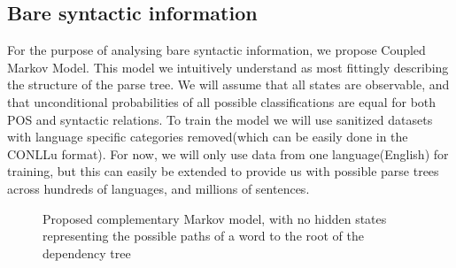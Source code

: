 \subsection{Bare syntactic information}
For the purpose of analysing bare syntactic information, we propose Coupled Markov Model. This model we intuitively understand as most fittingly describing
the structure of the parse tree. We will assume that all states are observable, and that unconditional probabilities of all possible classifications are equal for both POS and syntactic relations. To train the model we will use sanitized datasets with language specific categories removed(which can be easily done in the CONLLu format). For now, we will only use data from one language(English) for training, but this can easily be extended to provide us with possible parse trees across hundreds of languages, and millions of sentences.
\begin{figure}[h!]
\center
{}
\label{mark:synt}
\caption{Proposed complementary Markov model, with no hidden states representing the possible paths of a word to the root of the dependency tree}
\end{figure}
